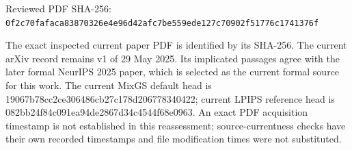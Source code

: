 \documentclass[11pt]{article}
\begin{document}
Reviewed PDF SHA-256: \nolinkurl{0f2c70fafaca83870326e4e96d42afc7be559ede127c70902f51776c1741376f}

The exact inspected current paper PDF is identified by its SHA-256. The current arXiv record remains v1 of 29 May 2025. Its implicated passages agree with the later formal NeurIPS 2025 paper, which is selected as the current formal source for this work. The current MixGS default head is 19067b78cc2ce306486cb27c178d206778340422; current LPIPS reference head is 082bb24f84c091ea94de2867d34c4544f68e0963. An exact PDF acquisition timestamp is not established in this reassessment; source-currentness checks have their own recorded timestamps and file modification times were not substituted.
\end{document}
